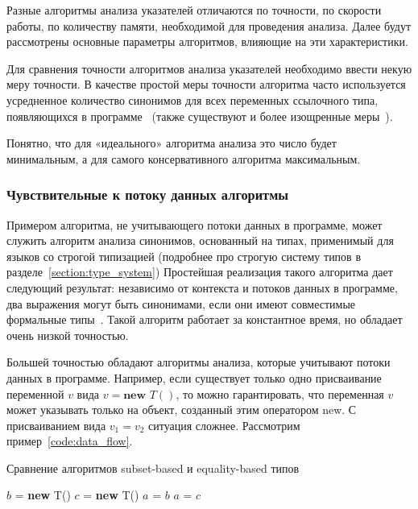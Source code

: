 \documentclass[14pt,titlepage]{extarticle}
\newcommand{\NEW}{\textbf{new }}
\newcommand{\eng}[1]{{\English#1}}
\begin{document}
      Разные алгоритмы анализа указателей отличаются по точности, по скорости
      работы, по количеству памяти, необходимой для проведения анализа.
      Далее будут рассмотрены основные параметры алгоритмов, влияющие на эти
      характеристики.

      Для сравнения точности алгоритмов анализа указателей необходимо ввести
      некую меру точности. В качестве простой меры точности алгоритма часто
      используется усредненное количество синонимов для всех переменных
      ссылочного типа, появляющихся в
      программе~\cite[раздел~3.2]{hind_pointer_analysis_not_solved_yet}
      (также существуют и более изощренные
      меры~\cite{hind_pointer_analysis_not_solved_yet,diwan_tbaa}).

      Понятно, что для «идеального» алгоритма анализа это число будет
      минимальным, а для самого консервативного алгоритма максимальным.

      \subsubsection{Чувствительные к потоку данных алгоритмы}
        \label{section:analysis_classification_data_flow}

        Примером алгоритма, не учитывающего потоки данных в программе, может
        служить алгоритм анализа синонимов, основанный на типах, применимый
        для языков со строгой типизацией (подробнее про строгую систему типов в
        разделе~\ref{section:type_system})
        Простейшая реализация такого алгоритма дает следующий результат:
        независимо от контекста и потоков данных в программе, два выражения
        могут быть синонимами, если они имеют совместимые формальные
        типы~\cite[раздел~2.2]{diwan_tbaa}.
        Такой алгоритм работает за константное время, но обладает очень низкой
        точностью.

        Большей точностью обладают алгоритмы анализа, которые учитывают потоки
        данных в программе.
        Например, если существует только одно присваивание переменной $v$ вида
        $v = \NEW T()$, то можно гарантировать, что переменная $v$ может
        указывать только на объект, созданный этим оператором \eng{new}.
        С присваиванием вида $v_1 = v_2$ ситуация сложнее. Рассмотрим
        пример~\ref{code:data_flow}.
        \begin{algorithm}
          \caption{Сравнение алгоритмов \eng{subset-based} и
                                        \eng{equality-based} типов}
          \label{code:data_flow}
          \begin{algorithmic}[1]
            \STATE $b$ = \NEW T()
            \STATE $c$ = \NEW T()
            \STATE $a$ = $b$
            \STATE $a$ = $c$
          \end{algorithmic}
        \end{algorithm}
\end{document}
